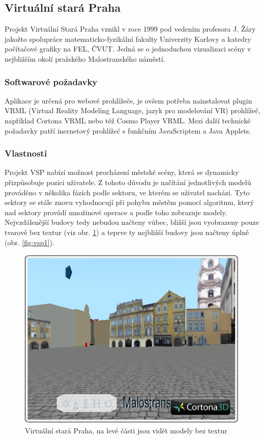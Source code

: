 \documentclass[thesis=B,czech]{FITthesis}[2012/06/26]
\begin{document}
    \subsection{Virtuální stará Praha}
    
    Projekt Virtuální Stará Praha vznikl v roce 1999 pod vedením profesora J. Žáry jakožto spolupráce matematicko-fyzikální fakulty Univerzity Karlovy a katedry počítačové grafiky na FEL, ČVUT. Jedná se o jednoduchou vizualizaci scény v nejbližším okolí pražského Malostranského náměstí. \cite{VSP}
    
        \subsubsection{Softwarové požadavky}
        
        Aplikace je určená pro webové prohlížeče, je ovšem potřeba nainstalovat plugin VRML (Virtual Reality Modeling Language, jazyk pro modelování VR) prohlížeč, například Cortona VRML nebo též Cosmo Player VRML. Mezi další technické požadavky patří inernetový prohlížeč s funkčním JavaScriptem a Java Applets. \cite{VSP}
        
        \subsubsection{Vlastnosti}
        
        Projekt VSP nabízí možnost procházení městské scény, která se dynamicky přizpůsobuje pozici uživatele. Z tohoto důvodu je načítání jednotlivých modelů prováděno v několika fázích podle sektoru, ve kterém se uživatel nachází. Tyto sektory se stále znovu vyhodnocují při pohybu městěm pomocí algoritmu, který nad sektory provádí množinové operace a podle toho zobrazuje modely. Nejvzdálenější budovy tedy nebudou načteny vůbec, bližší jsou vyobrazeny pouze tvarově bez textur (viz obr. \ref{fig:vsp2})  a teprve ty nejbližší budovy jsou načteny úplně (obr. \ref{fig:vsp1}).  \cite{VSP}
        
                
        
	
	\begin{figure}
  		\includegraphics{vsp2.png}
  		\caption{Virtuální stará Praha, na levé části jsou vidět modely bez textur}
  		\label{fig:vsp2}
	\end{figure}
	
\end{document}
